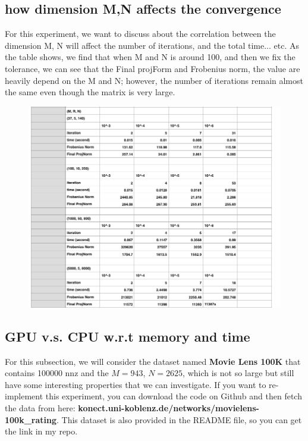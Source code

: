 \documentclass[12pt]{article}
\theoremstyle{remark}
\begin{document}
\begin{CJK}{UTF8}{bsmi}
\subsection{ how dimension M,N affects the convergence}
For this experiment, we want to discuss about the correlation between the dimension M, N will affect the number of iterations, and the total time... etc. As the table shows, we find that when M and N is around 100, and then we fix the tolerance, we can see that the Final projForm and Frobenius norm, the value are heavily depend on the M and N; however, the number of iterations remain almost the same even though the matrix is very large.
\begin{figure}[H]
    \begin{center}
        \includegraphics[width=500pt]{dimensionMN.png}
        \label{fig:arch_02}
    \end{center}
\end{figure}

\subsection{GPU v.s. CPU w.r.t memory and time}
For this subsection, we will consider the dataset named \textbf{Movie Lens 100K} that contains 100000 nnz and the $M = 943$, $N = 2625$, which is not so large but still have some interesting properties that we can investigate. If you want to re-implement this experiment, you can download the code on Github and then fetch the data from here: \textbf{konect.uni-koblenz.de/networks/movielens-100k\_rating}. This dataset is also provided in the README file, so you can get the link in my repo.


\end{CJK}
\end{document}
